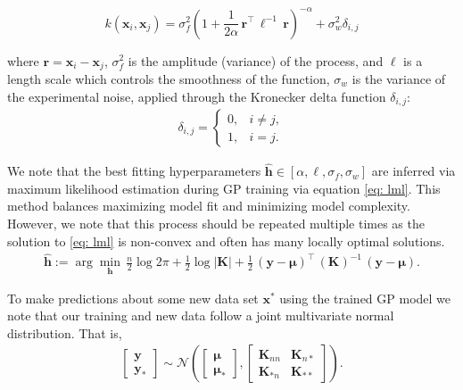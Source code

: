 \documentclass[journal=jacsat,manuscript=article]{achemso}
\newcommand{\xvec}{\ensuremath{\mathbf{x}}}
\begin{document}
\begin{equation}
    k(\xvec_i,\xvec_j) = \sigma_f^2 \left(1 +\frac{1}{2 \alpha} \,\mathbf{r}^\intercal \,{\ell}^{-1} \,\mathbf{r} \right)^{-\alpha} + \sigma_w^2\delta_{i,j}
    \label{kernel_final}
\end{equation}

\noindent where  $\mathbf{r} = \xvec_i - \xvec_j$, $\sigma_f^2$ is the amplitude (variance) of the process, and $\ell$ is a length scale which controls the smoothness of the function, $\sigma_w$ is the variance of the experimental noise, applied through the Kronecker delta function $\delta_{i,j}$:
\begin{gather*}
    \delta_{i,j} = 
    \begin{cases}
        0, & i\neq j,\\
        1, & i= j.
    \end{cases}
\end{gather*}

We note that the best fitting hyperparameters $\hat{\mathbf{h}} \in [\alpha, \ell, \sigma_{f}, \sigma_{w}]$ are inferred via maximum likelihood estimation during GP training via equation \eqref{eq: lml}. This method balances maximizing model fit and minimizing model complexity. However, we note that this process should be repeated multiple times as the solution to \eqref{eq: lml} is non-convex and often has many locally optimal solutions. 
\begin{gather}
    \hat{\mathbf{h}} := \arg \min_{\mathbf{h}} \, \frac{n}{2}\log{2\pi} + \frac{1}{2}\log{|\mathbf{K}|} +  \frac{1}{2}\,(\mathbf{y}-\boldsymbol{\mu})^\intercal \, (\mathbf{K})^{-1}\,(\mathbf{y}-\boldsymbol{\mu}). \label{eq: lml}
\end{gather}

To make predictions about some new data set $\xvec^*$ using the trained GP model we note that our training and new data follow a joint multivariate normal distribution. That is,
\begin{gather*}
    \begin{bmatrix}
        \mathbf{y} \\
        \mathbf{y}_*
    \end{bmatrix}
    \sim 
    \mathcal{N}\left(
    \begin{bmatrix}
        \boldsymbol{\mu}\\
        \boldsymbol{\mu}_*
    \end{bmatrix},
    \begin{bmatrix}
        \mathbf{K}_{nn} & \mathbf{K}_{n*} \\
        \mathbf{K}_{*n} & \mathbf{K}_{**}
    \end{bmatrix} \right).
\end{gather*}
\end{document}
